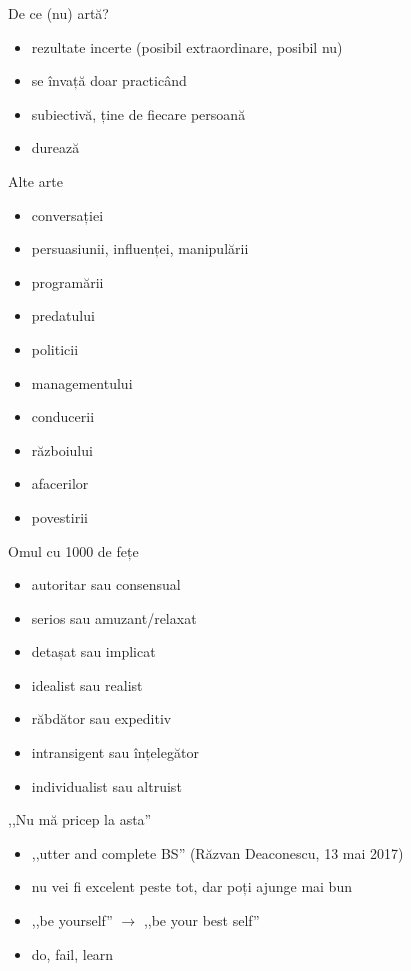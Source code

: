\documentclass{beamer}
\begin{document}
\begin{frame}{De ce (nu) artă?}
  \begin{itemize}
    \pause
    \item rezultate incerte (posibil extraordinare, posibil nu)
    \item se învață doar practicând
    \item subiectivă, ține de fiecare persoană
    \item durează
  \end{itemize}
\end{frame}

\begin{frame}{Alte arte}
  \begin{itemize}
    \pause
    \item conversației
    \item persuasiunii, influenței, manipulării
    \item programării
    \item predatului
    \item politicii
    \item managementului
    \item conducerii
    \item războiului
    \item afacerilor
    \item povestirii
  \end{itemize}
\end{frame}

\begin{frame}{Omul cu 1000 de fețe}
  \begin{itemize}
    \pause
    \item autoritar sau consensual
    \pause
    \item serios sau amuzant/relaxat
    \pause
    \item detașat sau implicat
    \pause
    \item idealist sau realist
    \pause
    \item răbdător sau expeditiv
    \pause
    \item intransigent sau înțelegător
    \pause
    \item individualist sau altruist
  \end{itemize}
\end{frame}

\begin{frame}{,,Nu mă pricep la asta''}
  \begin{itemize}
    \pause
    \item ,,utter and complete BS'' (Răzvan Deaconescu, 13 mai 2017)
    \pause
    \item nu vei fi excelent peste tot, dar poți ajunge mai bun
    \pause
    \item ,,be yourself'' $\rightarrow$ ,,be your best self''
    \pause
    \item do, fail, learn
  \end{itemize}
\end{frame}
\end{document}
